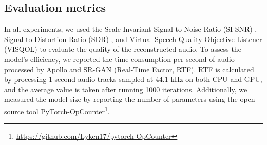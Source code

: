\subsection{Evaluation metrics}
In all experiments, we used the Scale-Invariant Signal-to-Noise Ratio (SI-SNR) \cite{le2019sdr}, Signal-to-Distortion Ratio (SDR) \cite{vincent2006performance}, and Virtual Speech Quality Objective Listener (VISQOL) \cite{hines2015visqol} to evaluate the quality of the reconstructed audio. To assess the model's efficiency, we reported the time consumption per second of audio processed by Apollo and SR-GAN (Real-Time Factor, RTF). RTF is calculated by processing 1-second audio tracks sampled at 44.1 kHz on both CPU and GPU, and the average value is taken after running 1000 iterations. Additionally, we measured the model size by reporting the number of parameters using the open-source tool PyTorch-OpCounter\footnote{\url{https://github.com/Lyken17/pytorch-OpCounter}}.